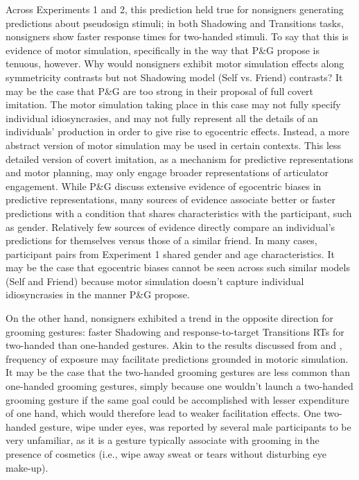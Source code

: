             Across Experiments 1 and 2, this prediction held true for nonsigners generating predictions about pseudosign stimuli; in both Shadowing and Transitions tasks, nonsigners show faster response times for two-handed stimuli. To say that this is evidence of motor simulation, specifically in the way that P\&G propose is tenuous, however. Why would nonsigners exhibit motor simulation effects along symmetricity contrasts but not Shadowing model (Self vs. Friend) contrasts? It may be the case that P\&G are too strong in their proposal of full covert imitation. The motor simulation taking place in this case may not fully specify individual idiosyncrasies, and may not fully represent all the details of an individuals’ production in order to give rise to egocentric effects. Instead, a more abstract version of motor simulation may be used in certain contexts. This less detailed version of covert imitation, as a mechanism for predictive representations and motor planning, may only engage broader representations of articulator engagement. While P\&G discuss extensive evidence of egocentric biases in predictive representations, many sources of evidence associate better or faster predictions with a condition that shares characteristics with the participant, such as gender. Relatively few sources of evidence directly compare an individual’s predictions for themselves versus those of a similar friend. In many cases, participant pairs from Experiment 1 shared gender and age characteristics. It may be the case that egocentric biases cannot be seen across such similar models (Self and Friend) because motor simulation doesn’t capture individual idiosyncrasies in the manner P\&G propose. \par
            On the other hand, nonsigners exhibited a trend in the opposite direction for grooming gestures: faster Shadowing and response-to-target Transitions RTs for two-handed than one-handed gestures. Akin to the results discussed from  and , frequency of exposure may facilitate predictions grounded in motoric simulation. It may be the case that the two-handed grooming gestures are less common than one-handed grooming gestures, simply because one wouldn't launch a two-handed grooming gesture if the same goal could be accomplished with lesser expenditure of one hand, which would therefore lead to weaker facilitation effects. One two-handed gesture, wipe under eyes, was reported by several male participants to be very unfamiliar, as it is a gesture typically associate with grooming in the presence of cosmetics (i.e., wipe away sweat or tears without disturbing eye make-up). \par

